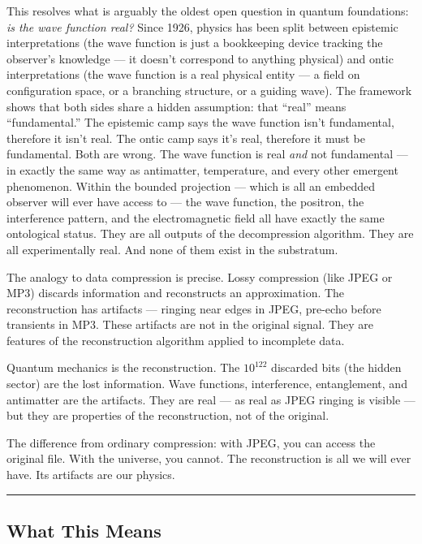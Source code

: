 \documentclass[
]{article}
\begin{document}
This resolves what is arguably the oldest open question in quantum
foundations: \emph{is the wave function real?} Since 1926, physics has
been split between epistemic interpretations (the wave function is just
a bookkeeping device tracking the observer's knowledge --- it doesn't
correspond to anything physical) and ontic interpretations (the wave
function is a real physical entity --- a field on configuration space,
or a branching structure, or a guiding wave). The framework shows that
both sides share a hidden assumption: that ``real'' means
``fundamental.'' The epistemic camp says the wave function isn't
fundamental, therefore it isn't real. The ontic camp says it's real,
therefore it must be fundamental. Both are wrong. The wave function is
real \emph{and} not fundamental --- in exactly the same way as
antimatter, temperature, and every other emergent phenomenon. Within the
bounded projection --- which is all an embedded observer will ever have
access to --- the wave function, the positron, the interference pattern,
and the electromagnetic field all have exactly the same ontological
status. They are all outputs of the decompression algorithm. They are
all experimentally real. And none of them exist in the substratum.

The analogy to data compression is precise. Lossy compression (like JPEG
or MP3) discards information and reconstructs an approximation. The
reconstruction has artifacts --- ringing near edges in JPEG, pre-echo
before transients in MP3. These artifacts are not in the original
signal. They are features of the reconstruction algorithm applied to
incomplete data.

Quantum mechanics is the reconstruction. The \(10^{122}\) discarded bits
(the hidden sector) are the lost information. Wave functions,
interference, entanglement, and antimatter are the artifacts. They are
real --- as real as JPEG ringing is visible --- but they are properties
of the reconstruction, not of the original.

The difference from ordinary compression: with JPEG, you can access the
original file. With the universe, you cannot. The reconstruction is all
we will ever have. Its artifacts are our physics.

\begin{center}\rule{0.5\linewidth}{0.5pt}\end{center}

\hypertarget{what-this-means}{%
\subsection{What This Means}\label{what-this-means}}
\end{document}
